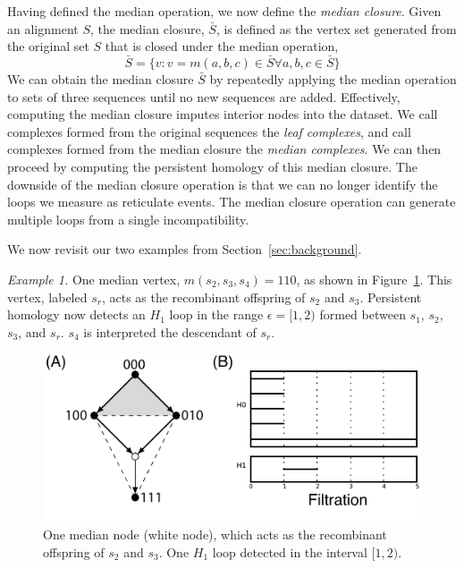 Having defined the median operation, we now define the \emph{median closure}.
Given an alignment $S$, the median closure, $\bar{S}$, is defined as the vertex set generated from the original set $S$ that is closed under the median operation,
\begin{equation}
\bar{S} = \{v \colon v=m(a,b,c) \in \bar{S} \forall a,b,c \in \bar{S}\}
\end{equation}
We can obtain the median closure $\bar{S}$ by repeatedly applying the median operation to sets of three sequences until no new sequences are added.
Effectively, computing the median closure imputes interior nodes into the dataset.
We call complexes formed from the original sequences the \emph{leaf complexes}, and call complexes formed from the median closure the \emph{median complexes}.
We can then proceed by computing the persistent homology of this median closure.
The downside of the median closure operation is that we can no longer identify the loops we measure as reticulate events.
The median closure operation can generate multiple loops from a single incompatibility.

We now revisit our two examples from Section~\ref{sec:background}.

\emph{Example 1.}
One median vertex, $m(s_2,s_3,s_4)=110$, as shown in Figure~\ref{fig:example_1_revisited}.
This vertex, labeled $s_r$, acts as the recombinant offspring of $s_2$ and $s_3$.
Persistent homology now detects an $H_{1}$ loop in the range $\epsilon=[1,2)$ formed between $s_1$, $s_2$, $s_3$, and $s_r$.
$s_4$ is interpreted the descendant of $s_r$.

\begin{figure}
\centering
\includegraphics[width=\columnwidth]{fig/complex_construction/example_1_revisited.pdf}
\caption{One median node (white node), which acts as the recombinant offspring of $s_2$ and $s_3$. One $H_1$ loop detected in the interval $[1,2)$.}
\label{fig:example_1_revisited}
\end{figure}

